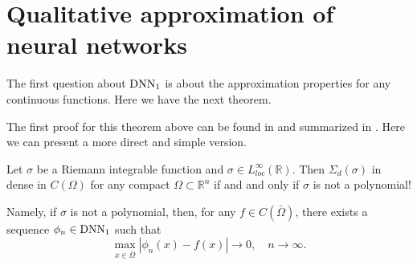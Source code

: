 \section{Qualitative approximation of neural networks}
The first question about ${\rm DNN}_1$ is about the approximation
properties for any continuous functions. Here we have the next
theorem. 

The first proof for this theorem above can be found in
\cite{leshno1993multilayer} and summarized in
\cite{pinkus1999approximation}.  %
Here we can present a
more direct and simple version.


\begin{theorem}
 Let $\sigma$ be a Riemann integrable function and $\sigma\in
 L_{loc}^\infty(\mathbb{R})$.  Then $\Sigma_d(\sigma)$ 
 in dense in
 $C(\Omega)$ for any compact $\Omega\subset \mathbb{R}^n$ if and and
 only if $\sigma$ is not a polynomial!

Namely, if $\sigma$ is not a polynomial,  then, for  any $f\in C(\bar \Omega)$,
 there exists a sequence $\phi_n \in {\rm DNN}_1$ such that
$$
	\max_{x\in \bar \Omega} |\phi_n(x) - f(x)| \to 0, \quad n \to \infty.
$$
\end{theorem}

